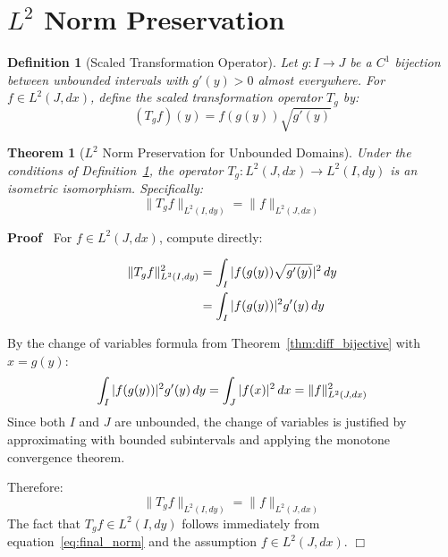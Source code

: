 \documentclass{article}
\newenvironment{proof}{\noindent\textbf{Proof\ }}{\hspace*{\fill}$\Box$\medskip}
\newtheorem{definition}{Definition}
\newtheorem{theorem}{Theorem}
\begin{document}
\section{$L^2$ Norm Preservation}

\begin{definition}
  [Scaled Transformation Operator]\label{def:scaled_transform}Let $g : I \to
  J$ be a $C^1$ bijection between unbounded intervals with $g' (y) > 0$ almost
  everywhere. For $f \in L^2 (J, dx)$, define the scaled transformation
  operator $T_g$ by:
  \begin{equation}
    \label{eq:scaled_transform} (T_g f) (y) = f (g (y)) \sqrt{g' (y)}
  \end{equation}
\end{definition}

\begin{theorem}
  [$L^2$ Norm Preservation for Unbounded
  Domains]\label{thm:l2_preservation}Under the conditions of
  Definition~\ref{def:scaled_transform}, the operator $T_g : L^2 (J, dx) \to
  L^2 (I, dy)$ is an isometric isomorphism. Specifically:
  \begin{equation}
    \label{eq:norm_equality} \|T_g f\|_{L^2 (I, dy)} = \|f\|_{L^2 (J, dx)}
  \end{equation}
\end{theorem}

\begin{proof}
  For $f \in L^2 (J, dx)$, compute directly:
  
  \begin{align}
    \|T_g f\|_{L^2 (I, dy)}^2 & = \int_I |f (g (y)) \sqrt{g' (y)} |^2 
    \hspace{0.17em} dy  \label{eq:norm_calc1}\\
    & = \int_I |f (g (y)) |^2 g' (y)  \hspace{0.17em} dy 
    \label{eq:norm_calc2}
  \end{align}
  
  By the change of variables formula from Theorem~\ref{thm:diff_bijective}
  with $x = g (y)$:
  \begin{equation}
    \label{eq:change_vars_apply} \int_I |f (g (y)) |^2 g' (y) \hspace{0.17em}
    dy = \int_J |f (x) |^2  \hspace{0.17em} dx = \|f\|_{L^2 (J, dx)}^2
  \end{equation}
  Since both $I$ and $J$ are unbounded, the change of variables is justified
  by approximating with bounded subintervals and applying the monotone
  convergence theorem.
  
  Therefore:
  \begin{equation}
    \label{eq:final_norm} \|T_g f\|_{L^2 (I, dy)} = \|f\|_{L^2 (J, dx)}
  \end{equation}
  The fact that $T_g f \in L^2 (I, dy)$ follows immediately from
  equation~\eqref{eq:final_norm} and the assumption $f \in L^2 (J, dx)$.
\end{proof}
\end{document}
